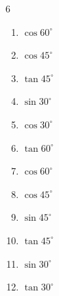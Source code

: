\begin{multicols}{6}
\begin{enumerate}

  \item $\displaystyle \cos{60^\circ}$


  \item $\displaystyle \cos{45^\circ}$


  \item $\displaystyle \tan{45^\circ}$

        \phantom{$\displaystyle =1$}

  \item $\displaystyle \sin{30^\circ}$


  \item $\displaystyle \cos{30^\circ}$


  \item $\displaystyle \tan{60^\circ}$


  \item $\displaystyle \cos{60^\circ}$


\columnbreak %

\resetques

  \item $\displaystyle \cos{45^\circ}$


  \item $\displaystyle \sin{45^\circ}$


  \item $\displaystyle \tan{45^\circ}$

        \phantom{$\displaystyle =1$}

  \item $\displaystyle \sin{30^\circ}$


  \item $\displaystyle \tan{30^\circ}$


\end{enumerate}
\end{multicols}
